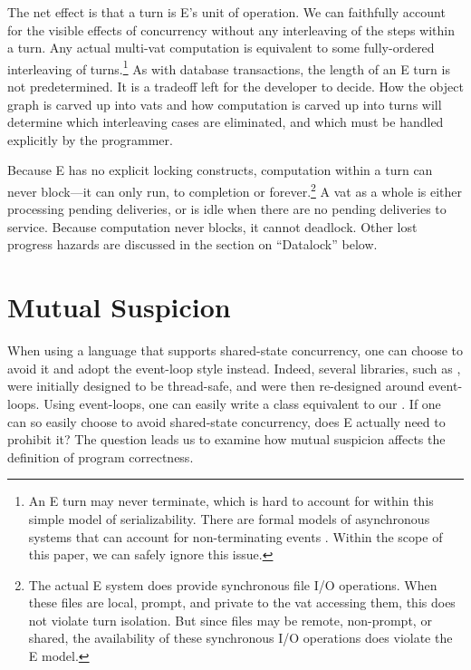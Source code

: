 \documentclass{llncs}
\begin{document}
The net effect is that a turn is E's unit of operation. We can
faithfully account for the visible effects of concurrency without any
interleaving of the steps within a turn. Any actual multi-vat
computation is equivalent to some fully-ordered interleaving of
turns.\footnote{
%
An E turn may never terminate, which is hard to account for within
this simple model of serializability. There are formal models of
asynchronous systems that can account for non-terminating events
\cite{chandy:snapshots}. Within the scope of this paper, we can safely
ignore this issue.}
%
As with database transactions, the length of an E turn is not
predetermined. It is a tradeoff left for the developer to decide. How
the object graph is carved up into vats and how computation is carved
up into turns will determine which interleaving cases are eliminated,
and which must be handled explicitly by the programmer.

Because E has no explicit locking constructs, computation within a
turn can never block---it can only run, to completion or
forever.\footnote{
%
The actual E system does provide synchronous file I/O operations. When
these files are local, prompt, and private to the vat accessing them,
this does not violate turn isolation. But since files may be remote,
non-prompt, or shared, the availability of these synchronous I/O
operations does violate the E model.}
%
A vat as a whole is either processing pending deliveries, or is idle
when there are no pending deliveries to service. Because computation
never blocks, it cannot deadlock.  Other lost progress hazards are
discussed in the section on ``Datalock'' below.

\section{Mutual Suspicion}

When using a language that supports shared-state concurrency, one can
choose to avoid it and adopt the event-loop style instead. Indeed,
several  libraries, such as , were initially
designed to be thread-safe, and were then re-designed around
event-loops. Using event-loops, one can easily write a 
class equivalent to our .  If one can so easily
choose to avoid shared-state concurrency, does E actually need to
prohibit it? The question leads us to examine  how mutual suspicion affects the definition of program
correctness.
\end{document}
